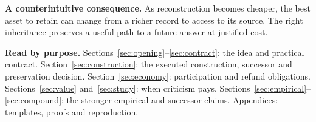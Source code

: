 \documentclass[11pt,letterpaper]{article}
\theoremstyle{remark}\newtheorem{remark}{Remark}[section]
\begin{document}
\textbf{A counterintuitive consequence.} As reconstruction becomes cheaper, the best asset to retain can change from a richer record to access to its source. The right inheritance preserves a useful path to a future answer at justified cost.

\textbf{Read by purpose.} Sections~\ref{sec:opening}--\ref{sec:contract}: the idea and practical contract. Section~\ref{sec:construction}: the executed construction, successor and preservation decision. Section~\ref{sec:economy}: participation and refund obligations. Sections~\ref{sec:value} and~\ref{sec:study}: when criticism pays. Sections~\ref{sec:empirical}--\ref{sec:compound}: the stronger empirical and successor claims. Appendices: templates, proofs and reproduction.
\clearpage
\tableofcontents
\clearpage






\end{document}
